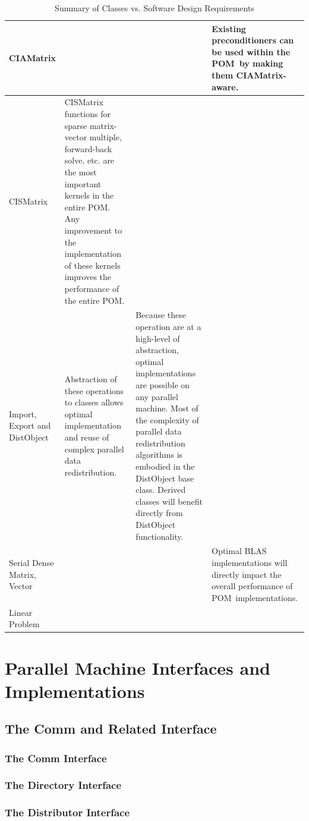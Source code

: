 \documentclass[10pt,relax]{PetraObjectModel}
\newcommand{\POM}{POM}
\begin{document}
\begin{table}
\begin{tabular}{|p{0.8in}||p{1.5in}|p{1.5in}|p{1.5in}|}
    CIAMatrix& & & Existing preconditioners can be used within the \POM\ by making them CIAMatrix-aware. \\\hline
    CISMatrix & CISMatrix functions for sparse matrix-vector multiple, forward-back solve, etc. are the most important kernels
    in the entire \POM.  Any improvement to the implementation of these kernels improves the performance of the entire \POM.&
    & \\\hline
    Import, Export and DistObject & Abstraction of these operations to classes allows optimal implementation and reuse of complex
    parallel data redistribution. &
    Because these operation are at a high-level of abstraction, optimal implementations are possible on any parallel machine.
    Most of the complexity of parallel data redistribution algorithms is embodied in the DistObject base class.  Derived
    classes will benefit directly from DistObject functionality. & \\\hline
    Serial Dense Matrix, Vector &  &
    & Optimal BLAS implementations will directly impact the overall performance of \POM\ implementations.\\\hline
    Linear Problem & & & \\\hline

  \end{tabular}
  \caption{Summary of Classes vs. Software Design Requirements}\label{Table:ClassesVsSWRequirements}
\end{table}



\section{Parallel Machine Interfaces and
Implementations}

\subsection{The Comm and Related Interface}

\subsubsection{The Comm Interface}
\subsubsection{The Directory Interface}
\subsubsection{The Distributor Interface}
\end{document}
